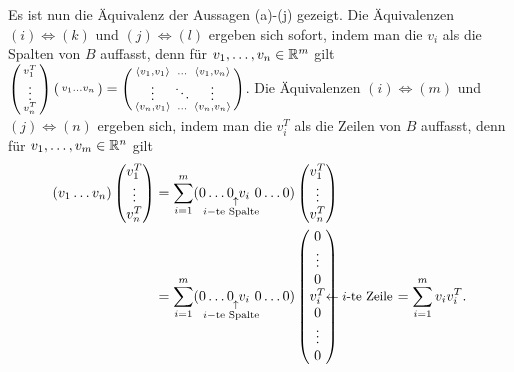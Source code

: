 \documentclass[../../main.tex]{subfiles}
\begin{document}
\begin{cproof}
\noindent Es ist nun die Äquivalenz der Aussagen (a)-(j) gezeigt. Die Äquivalenzen \underline{$(i)\Longleftrightarrow (k)$} und \underline{$(j)\Longleftrightarrow (l)$} ergeben sich sofort, indem man die $v_i$ als die Spalten von $B$ auffasst, denn für $v_1,\ldots ,v_n\in \mathbb R^m$ gilt $\left(\begin{smallmatrix}v_1^T\\\vdots\\ v_n^T\end{smallmatrix}\right)\left(\begin{smallmatrix}v_1\hdots v_n\end{smallmatrix}\right)=\left(\begin{smallmatrix}\langle v_1,v_1\rangle&\hdots&\langle v_1,v_n\rangle\\\vdots &\ddots&\vdots\\ \langle v_n,v_1\rangle&\hdots&\langle v_n,v_n\rangle\end{smallmatrix}\right)$. Die Äquivalenzen \underline{$(i)\Longleftrightarrow (m)$} und \underline{$(j)\Longleftrightarrow (n)$} ergeben sich, indem man die $v^T_i$ als die Zeilen von $B$ auffasst, denn für $v_1,\ldots ,v_m\in \mathbb R^n$ gilt
\begin{align*}
(v_1\hdots v_n)\begin{pmatrix}v_1^T\\\vdots\\ v_n^T\end{pmatrix}&=\sum_{i=1}^m(0\hdots 0\ v_i\ 0\blap{\llap{$\begin{smallmatrix}\ \ \uparrow\\i-\text{te Spalte}\end{smallmatrix}$}}\hdots 0)\begin{pmatrix}v_1^T\\\vdots\\ v_n^T\end{pmatrix}\\
&=\sum_{i=1}^m(0\hdots 0\ v_i\ 0\blap{\llap{$\begin{smallmatrix}\ \ \uparrow\\i-\text{te Spalte}\end{smallmatrix}$}}\hdots 0)\begin{pmatrix}0\\\vdots\\0\\v_i^T\rlap{\small$\leftarrow i$-te Zeile}\\0\\\vdots\\0\end{pmatrix}\qquad\qquad=\sum_{i=1}^m v_iv_i^T.
\end{align*}
\end{cproof}
\end{document}
